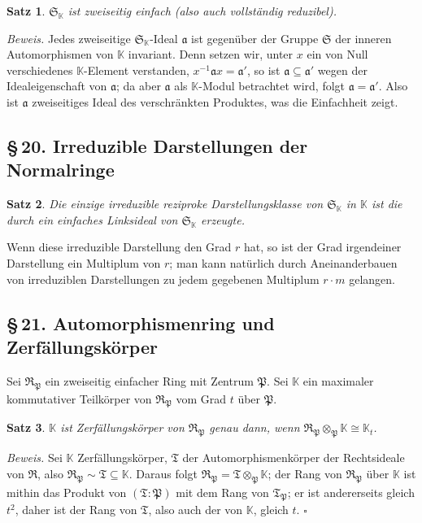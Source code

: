 \documentclass[10pt,a4paper]{article}
\theoremstyle{plain}
\newtheorem{satz}{Satz}[section]
\theoremstyle{definition}
\theoremstyle{remark}
\newcommand{\KK}{\mathbb{K}}
\newcommand{\ida}{\mathfrak{a}}
\newcommand{\tensor}{\otimes}\newcommand{\Tensor}{\bigotimes}
\begin{document}
\begin{satz}
$\mathfrak{S}_\KK$ ist zweiseitig einfach (also auch vollst\"andig reduzibel).
\end{satz}

\textit{Beweis.} Jedes zweiseitige $\mathfrak{S}_\KK$-Ideal $\ida$ ist gegen\"uber der Gruppe $\mathfrak{S}$ der inneren Automorphismen von $\KK$ invariant. Denn setzen wir, unter $x$ ein von Null verschiedenes $\KK$-Element verstanden, $x^{-1} \ida x = \ida'$, so ist $\ida \subseteq \ida'$ wegen der Idealeigenschaft von $\ida$; da aber $\ida$ als $\KK$-Modul betrachtet wird, folgt $\ida = \ida'$. Also ist $\ida$ zweiseitiges Ideal des verschr\"ankten Produktes, was die Einfachheit zeigt.

\subsection*{\S\,20. Irreduzible Darstellungen der Normalringe}

\begin{satz}
Die einzige irreduzible reziproke Darstellungsklasse von $\mathfrak{S}_\KK$ in $\KK$ ist die durch ein einfaches Linksideal von $\mathfrak{S}_\KK$ erzeugte.
\end{satz}

Wenn diese irreduzible Darstellung den Grad $r$ hat, so ist der Grad irgendeiner Darstellung ein Multiplum von $r$; man kann nat\"urlich durch Aneinanderbauen von irreduziblen Darstellungen zu jedem gegebenen Multiplum $r \cdot m$ gelangen.

\subsection*{\S\,21. Automorphismenring und Zerf\"allungsk\"orper}

Sei $\mathfrak{R}_\mathfrak{P}$ ein zweiseitig einfacher Ring mit Zentrum $\mathfrak{P}$. Sei $\KK$ ein maximaler kommutativer Teilk\"orper von $\mathfrak{R}_\mathfrak{P}$ vom Grad $t$ \"uber $\mathfrak{P}$.

\begin{satz}
$\KK$ ist Zerf\"allungsk\"orper von $\mathfrak{R}_\mathfrak{P}$ genau dann, wenn $\mathfrak{R}_\mathfrak{P} \tensor_\mathfrak{P} \KK \cong \KK_t$.
\end{satz}

\textit{Beweis.} Sei $\KK$ Zerf\"allungsk\"orper, $\mathfrak{T}$ der Automorphismenk\"orper der Rechtsideale von $\mathfrak{R}$, also $\mathfrak{R}_\mathfrak{P} \sim \mathfrak{T} \subseteq \KK$. Daraus folgt $\mathfrak{R}_\mathfrak{P} = \mathfrak{T} \tensor_\mathfrak{P} \KK$; der Rang von $\mathfrak{R}_\mathfrak{P}$ \"uber $\KK$ ist mithin das Produkt von $(\mathfrak{T} : \mathfrak{P})$ mit dem Rang von $\mathfrak{T}_\mathfrak{P}$; er ist andererseits gleich $t^2$, daher ist der Rang von $\mathfrak{T}$, also auch der von $\KK$, gleich $t$. \hfill$\square$
\end{document}
